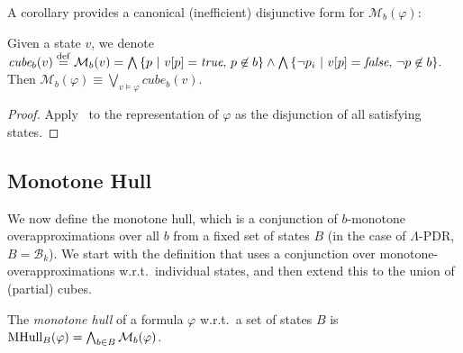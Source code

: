 \documentclass[acmsmall,screen]{acmart}
\newcommand{\toolong}[1]{#1}
\newcommand{\toolong}[1]{}
\newcommand{\true}{{\textit{true}}}
\newcommand{\false}{{\textit{false}}}
\newcommand{\set}[1]{\{{#1}\}}
\newcommand{\eqdef}{\stackrel{\rm def}{=}}
\newcommand{\bkwrch}[1]{\mathcal{B}_{#1}}
\newcommand{\cubemon}[2]{\textit{cube}_{{#2}}({#1})}
\newcommand{\monox}[2]{\mathcal{M}_{#2}({#1})}
\newcommand{\mhull}[2]{{\rm MHull}_{#2}({#1})}
\begin{document}
A corollary provides a canonical (inefficient) disjunctive form for $\monox{\varphi}{b}$:
%
\begin{corollary}
\label{lem:monox-disjunction-cubes}
Given a state $v$, we denote
%
%
%
%
%
$
	\cubemon{v}{b} \eqdef \monox{v}{b} =
					 \bigwedge{\set{p \ | \ v[p]=\true, \, p \not\in b}} \land
					 \bigwedge{\set{\neg p_i \ | \ v[p]=\false, \, \neg p \not\in b}}.
$
Then $\monox{\varphi}{b} \equiv \bigvee_{v \models \varphi}{\cubemon{v}{b}}$.
%
\end{corollary}
\toolong{
\begin{proof}
Apply~ to the representation of $\varphi$ as the disjunction of all satisfying states.
%
\end{proof}
}

%
%
%
%
%
%
%
%


\subsection{Monotone Hull}
\label{sec:monotone-hull}
%
We now define the monotone hull, which is a conjunction of $b$-monotone overapproximations over all $b$ from a fixed set of states $B$ (in the case of $\Lambda$-PDR, $B = \bkwrch{k}$). We start with the definition that uses a conjunction over monotone-overapproximations w.r.t.\ individual states, and then extend this to the union of (partial) cubes.
%
\begin{definition}
The \emph{monotone hull} of a formula $\varphi$ w.r.t.\ a set of states $B$ is $\mhull{\varphi}{B} = \bigwedge_{b \in B}{\monox{\varphi}{b}}$. %
\end{definition}
%
\end{document}
